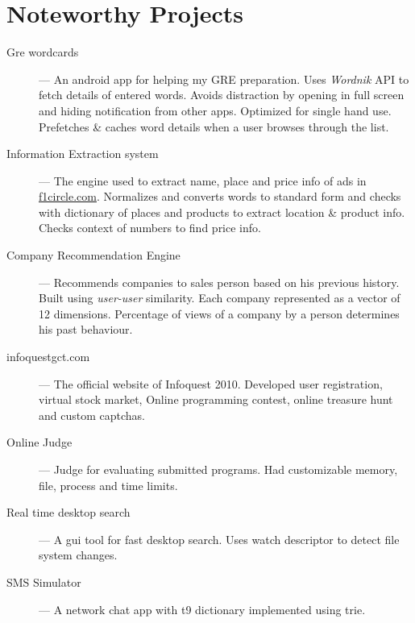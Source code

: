 \documentclass{resume}
\begin{document}
\section{Noteworthy Projects}
\begin{description}
  \item[Gre wordcards] --- An android app for helping my GRE preparation.  Uses \textit{Wordnik} API to fetch details of entered words.  Avoids distraction by opening in full screen and hiding notification from other apps. Optimized for single hand use.  Prefetches \& caches word details when a user browses through the list.
  \item[Information Extraction system] --- The engine used to extract name, place and price info of ads in \url{f1circle.com}.  Normalizes and converts words to standard form and checks with dictionary of places and products to extract location \& product info.  Checks context of numbers to find price info.
  \item[Company Recommendation Engine] --- Recommends companies to sales person based on his previous history.  Built using \textit{user-user} similarity. Each company represented as a vector of 12 dimensions.  Percentage of views of a company by a person determines his past behaviour.
  \item[infoquestgct.com] --- The official website of Infoquest 2010. Developed user registration, virtual stock market, Online programming contest, online treasure hunt and custom captchas.
  \item[Online Judge] --- Judge for evaluating submitted programs.  Had customizable memory, file, process and time limits.
  \item[Real time desktop search] --- A gui tool for fast desktop search.  Uses watch descriptor to detect file system changes.
  \item[SMS Simulator] --- A network chat app with t9 dictionary implemented using trie.
\end{description}
\end{document}
